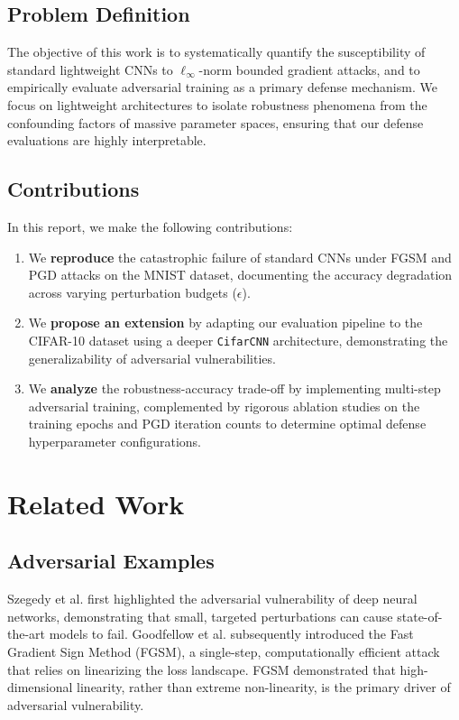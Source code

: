 \documentclass[conference,10pt]{IEEEtran}
\begin{document}
\subsection{Problem Definition}
The objective of this work is to systematically quantify the susceptibility of standard lightweight CNNs to $\ell_\infty$-norm bounded gradient attacks, and to empirically evaluate adversarial training \cite{madry2018pgd} as a primary defense mechanism. We focus on lightweight architectures to isolate robustness phenomena from the confounding factors of massive parameter spaces, ensuring that our defense evaluations are highly interpretable.

\subsection{Contributions}
In this report, we make the following contributions:
\begin{enumerate}
    \item We \textbf{reproduce} the catastrophic failure of standard CNNs under FGSM and PGD attacks on the MNIST dataset, documenting the accuracy degradation across varying perturbation budgets ($\epsilon$).
    \item We \textbf{propose an extension} by adapting our evaluation pipeline to the CIFAR-10 dataset using a deeper \texttt{CifarCNN} architecture, demonstrating the generalizability of adversarial vulnerabilities.
    \item We \textbf{analyze} the robustness-accuracy trade-off by implementing multi-step adversarial training, complemented by rigorous ablation studies on the training epochs and PGD iteration counts to determine optimal defense hyperparameter configurations.
\end{enumerate}


\section{Related Work}

\subsection{Adversarial Examples}
Szegedy et al. \cite{szegedy2014} first highlighted the adversarial vulnerability of deep neural networks, demonstrating that small, targeted perturbations can cause state-of-the-art models to fail. Goodfellow et al. \cite{goodfellow2015fgsm} subsequently introduced the Fast Gradient Sign Method (FGSM), a single-step, computationally efficient attack that relies on linearizing the loss landscape. FGSM demonstrated that high-dimensional linearity, rather than extreme non-linearity, is the primary driver of adversarial vulnerability.
\end{document}
